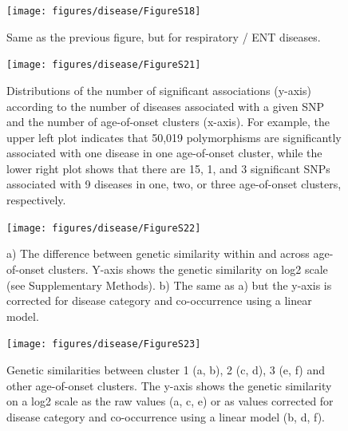 \documentclass[12pt,twoside]{unicam}
\begin{document}
\begin{figure}

{\centering \texttt{[image: figures/disease/FigureS18]} 

}

\caption[Age-of-onset distributions for the respiratory / ENT diseases.]{Same as the previous figure, but for respiratory / ENT diseases.}\label{fig:disFigS18}
\end{figure}

\begin{figure}

{\centering \texttt{[image: figures/disease/FigureS21]} 

}

\caption[Distributions of the number of significant associations according to the number of diseases associated with a given SNP and the number of age-of-onset clusters.]{Distributions of the number of significant associations (y-axis) according to the number of diseases associated with a given SNP and the number of age-of-onset clusters (x-axis). For example, the upper left plot indicates that 50,019 polymorphisms are significantly associated with one disease in one age-of-onset cluster, while the lower right plot shows that there are 15, 1, and 3 significant SNPs associated with 9 diseases in one, two, or three age-of-onset clusters, respectively.}\label{fig:disFigS21}
\end{figure}

\begin{figure}

{\centering \texttt{[image: figures/disease/FigureS22]} 

}

\caption[The difference between genetic similarity within and across age-of-onset clusters.]{a) The difference between genetic similarity within and across age-of-onset clusters. Y-axis shows the genetic similarity on log2 scale (see Supplementary Methods). b) The same as a) but the y-axis is corrected for disease category and co-occurrence using a linear model. }\label{fig:disFigS22}
\end{figure}

\begin{figure}

{\centering \texttt{[image: figures/disease/FigureS23]} 

}

\caption[Genetic similarities between cluster 1, 2 , 3 and other age-of-onset clusters.]{Genetic similarities between cluster 1 (a, b), 2 (c, d), 3 (e, f) and other age-of-onset clusters. The y-axis shows the genetic similarity on a log2 scale as the raw values (a, c, e) or as values corrected for disease category and co-occurrence using a linear model (b, d, f).}\label{fig:disFigS23}
\end{figure}
\end{document}
